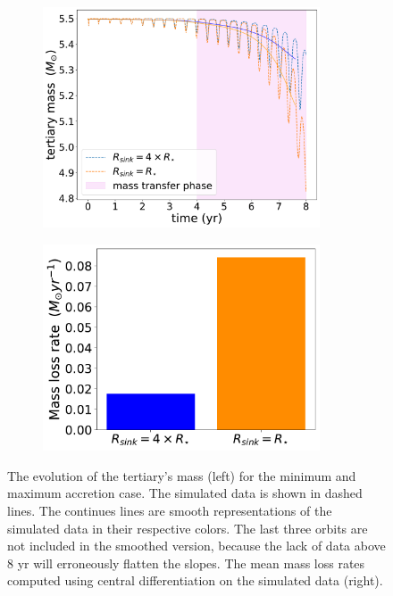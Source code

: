 \begin{figure}[!htb]
    \centering
    \begin{subfigure}{.5\textwidth}
    \centering
    \includegraphics[width=0.9\textwidth]{Thesis/graphs/accretion_case/accretion_mass_loss.pdf}
    \end{subfigure}%
    \begin{subfigure}{.5\textwidth}
    \centering
    \includegraphics[width=0.9\textwidth]{Thesis/graphs/accretion_case/accretion_giant_mass_loss_rate.pdf}
    \end{subfigure}
    \caption{ The evolution of the tertiary's mass (left) for the minimum and maximum accretion case. The simulated data is shown in dashed lines. The continues lines are smooth representations of the simulated data in their respective colors. The last three orbits are not included in the smoothed version, because the lack of data above $8$ yr will erroneously flatten the slopes. The mean mass loss rates computed using central differentiation on the simulated data (right).}
    \label{fig:accretion_tertiary_mass}
\end{figure}
